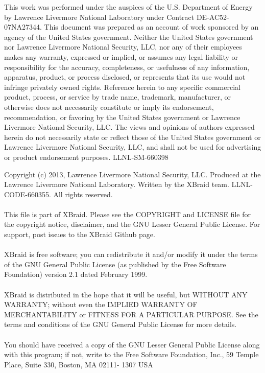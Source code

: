 \documentclass[twoside]{article}
\newcommand{\+}{\discretionary{\mbox{\scriptsize$\hookleftarrow$}}{}{}}
\begin{document}
\begin{titlepage}
This work was performed under the auspices of the U.S. Department of Energy by Lawrence Livermore National Laboratory under Contract DE-AC52-07NA27344. This document was prepared as an account of work sponsored by an agency of the United States government. Neither the United States government nor Lawrence Livermore National Security, LLC, nor any of their employees makes any warranty, expressed or implied, or assumes any legal liability or responsibility for the accuracy, completeness, or usefulness of any information, apparatus, product, or process disclosed, or represents that its use would not infringe privately owned rights. Reference herein to any specific commercial product, process, or service by trade name, trademark, manufacturer, or otherwise does not necessarily constitute or imply its endorsement, recommendation, or favoring by the United States government or Lawrence Livermore National Security, LLC. The views and opinions of authors expressed herein do not necessarily state or reflect those of the United States government or Lawrence Livermore National Security, LLC, and shall not be used for advertising or product endorsement purposes.
LLNL-SM-660398
\pagebreak

Copyright (c) 2013,  Lawrence Livermore National Security, LLC.
Produced at the Lawrence Livermore National Laboratory.
Written by the XBraid team. LLNL-CODE-660355.  All rights reserved.
~\\~\\ 
This file is part of XBraid. Please see the COPYRIGHT and LICENSE file 
for the copyright notice, disclaimer, and the GNU Lesser General Public License.
For support, post issues to the XBraid Github page.
~\\~\\
XBraid is free software; you can redistribute it and/or modify it under the
terms of the GNU General Public License (as published by the Free Software
Foundation) version 2.1 dated February 1999.
~\\~\\
XBraid is distributed in the hope that it will be useful, but WITHOUT ANY
WARRANTY; without even the IMPLIED WARRANTY OF MERCHANTABILITY or FITNESS FOR A
PARTICULAR PURPOSE. See the terms and conditions of the GNU General Public
License for more details.
~\\~\\
You should have received a copy of the GNU Lesser General Public License along
with this program; if not, write to the Free Software Foundation, Inc., 59
Temple Place, Suite 330, Boston, MA 02111- 1307 USA

\end{titlepage}
\tableofcontents
{}
\hypersetup{pageanchor=true}

\end{document}
